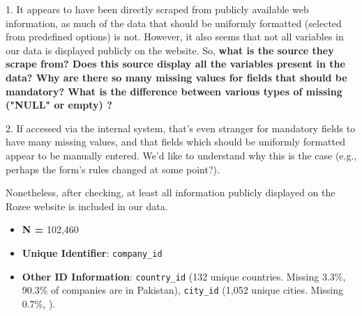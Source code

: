 \documentclass[12pt]{article}
\begin{document}
1. It appears to have been directly scraped from publicly available web information, as much of the data that should be uniformly formatted (selected from predefined options) is not. However, it also seems that not all variables in our data is displayed publicly on the website. So, \textbf{what is the source they scrape from? Does this source display all the variables present in the data? Why are there so many missing values for fields that should be mandatory? What is the difference between various types of missing ("NULL" or empty) ?}

2. If accessed via the internal system, that's even stranger for mandatory fields to have many missing values, and that fields which should be uniformly formatted appear to be manually entered. We'd like to understand why this is the case (e.g., perhaps the form's rules changed at some point?). 

Nonetheless, after checking, at least all information publicly displayed on the Rozee website is included in our data.



\begin{itemize}
    \item \textbf{N =} 102,460
    \item \textbf{Unique Identifier}: \texttt{company\_id}
    \item \textbf{Other ID Information}: \texttt{country\_id} (132 unique countries. Missing 3.3\%,  90.3\% of companies are in Pakistan), \texttt{city\_id} (1,052 unique cities. Missing 0.7\%,  ). %
\end{itemize}
\end{document}
